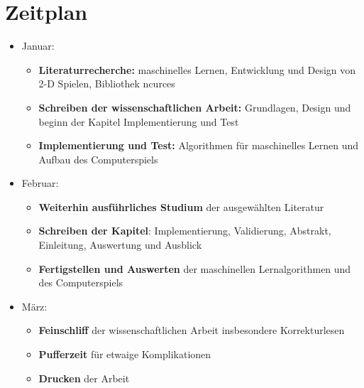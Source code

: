 \documentclass[12pt,a4paper]{article}
\begin{document}
\section*{Zeitplan}
\begin{itemize}
	\item Januar:
	\begin{itemize}
		\item \textbf{Literaturrecherche:} maschinelles Lernen, Entwicklung und Design von 2-D Spielen, Bibliothek ncurces
		\item \textbf{Schreiben der wissenschaftlichen Arbeit:} Grundlagen, Design und beginn der Kapitel Implementierung und Test
		\item \textbf{Implementierung und Test:} Algorithmen für maschinelles Lernen und Aufbau des Computerspiels
	\end{itemize}
	\item Februar:
	\begin{itemize}
		\item \textbf{Weiterhin ausführliches Studium} der ausgewählten Literatur
		\item \textbf{Schreiben der Kapitel}: Implementierung, Validierung, Abstrakt, Einleitung, Auswertung und Ausblick
		\item \textbf{Fertigstellen und Auswerten} der maschinellen Lernalgorithmen und des Computerspiels
	\end{itemize}
	\item März:
	\begin{itemize}
		\item \textbf{Feinschliff} der wissenschaftlichen Arbeit insbesondere Korrekturlesen
		\item \textbf{Pufferzeit} für etwaige Komplikationen
		\item \textbf{Drucken} der Arbeit
	\end{itemize}
\end{itemize}
\end{document}
